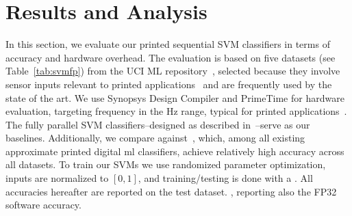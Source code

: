 
\section{Results and Analysis} \label{sec:eval}

In this section, we evaluate our printed sequential SVM classifiers in terms of accuracy and hardware overhead.
The evaluation is based on five datasets (see Table~\ref{tab:svmfp}) from the UCI ML repository~\cite{Dua:2019:uci_datasets}, selected because they involve sensor inputs relevant to printed applications~\cite{Mubarik:MICRO:2020:printedml} and are frequently used by the state of the art.
We use Synopsys Design Compiler and PrimeTime for hardware evaluation, targeting frequency in the Hz range, typical for printed applications~\cite{Bleier:ISCA:2020:printedml}.
The fully parallel SVM classifiers--designed as described in~\cite{Mubarik:MICRO:2020:printedml}--serve as our baselines.
Additionally, we compare against~\cite{Armeniakos:TCAD2023:cross,Armeniakos:TC2023:codesign}, which, among all existing approximate printed digital \gls{ml} classifiers, achieve relatively high accuracy across all datasets.
To train our SVMs we use randomized parameter optimization, inputs are normalized to $[0,1]$, and training/testing is done with a .
All accuracies hereafter are reported on the test dataset.
, reporting also the FP32 software accuracy.

